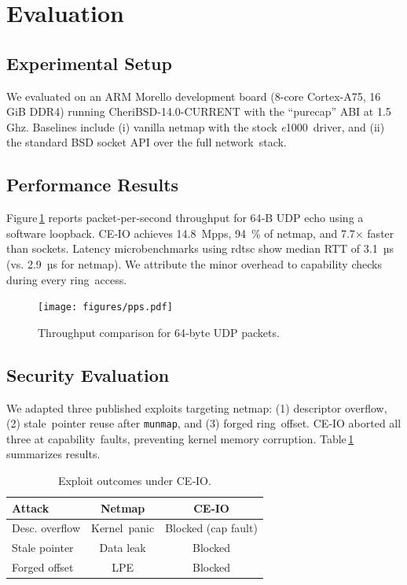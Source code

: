 \documentclass[sigconf]{acmart}
\newcommand{\e}{\textit{e}1000\xspace}
\begin{document}
\section{Evaluation}
\label{sec:eval}
\subsection{Experimental Setup}
We evaluated on an ARM Morello development board (8-core Cortex-A75, 16 GiB DDR4) running CheriBSD-14.0-CURRENT with the “purecap” ABI at 1.5 Ghz. Baselines include (i) vanilla netmap with the stock \e driver, and (ii) the standard BSD socket API over the full network stack.

\subsection{Performance Results}
Figure\,\ref{fig:pps} reports packet‑per‑second throughput for 64‑B UDP echo using a software loopback. CE‑IO achieves 14.8 Mpps, 94 \% of netmap, and 7.7× faster than sockets. Latency microbenchmarks using rdtsc show median RTT of 3.1 µs (vs. 2.9 µs for netmap). We attribute the minor overhead to capability checks during every ring access.

\begin{figure}[t]
  \centering
  \texttt{[image: figures/pps.pdf]}
  \caption{Throughput comparison for 64‑byte UDP packets.}
  \label{fig:pps}
\end{figure}

\subsection{Security Evaluation}
We adapted three published exploits targeting netmap: (1) descriptor overflow, (2) stale pointer reuse after \texttt{munmap}, and (3) forged ring offset. CE‑IO aborted all three at capability faults, preventing kernel memory corruption. Table\,\ref{tab:attacks} summarizes results.

\begin{table}[h]
  \caption{Exploit outcomes under CE‑IO.}
  \label{tab:attacks}
  \begin{tabular}{lcc}
    \toprule
    Attack & Netmap & CE‑IO \\
    \midrule
    Desc. overflow & Kernel panic & Blocked (cap fault) \\
    Stale pointer  & Data leak   & Blocked \\
    Forged offset  & LPE         & Blocked \\
    \bottomrule
  \end{tabular}
\end{table}
\end{document}
